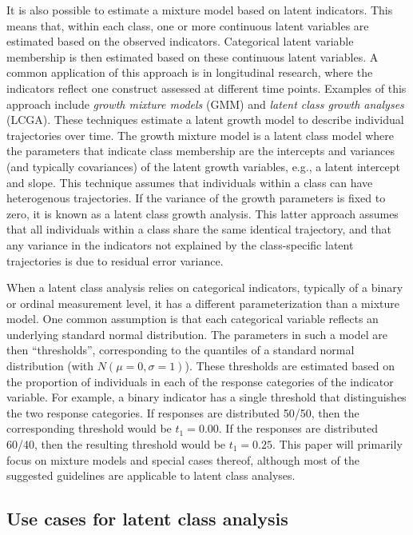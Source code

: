 \documentclass[
  ,man]{apa6}
\begin{document}
It is also possible to estimate a mixture model based on latent indicators.
This means that, within each class, one or more continuous latent variables are estimated based on the observed indicators.
Categorical latent variable membership is then estimated based on these continuous latent variables.
A common application of this approach is in longitudinal research, where the indicators reflect one construct assessed at different time points.
Examples of this approach include \emph{growth mixture models} (GMM) and \emph{latent class growth analyses} (LCGA).
These techniques estimate a latent growth model to describe individual trajectories over time.
The growth mixture model is a latent class model where the parameters that indicate class membership
are the intercepts and variances (and typically covariances) of the latent growth variables, e.g., a latent intercept and slope.
This technique assumes that individuals within a class can have heterogenous trajectories.
If the variance of the growth parameters is fixed to zero, it is known as a latent class growth analysis.
This latter approach assumes that all individuals within a class share the same identical trajectory,
and that any variance in the indicators not explained by the class-specific latent trajectories is due to residual error variance.

When a latent class analysis relies on categorical indicators,
typically of a binary or ordinal measurement level,
it has a different parameterization than a mixture model.
One common assumption is that each categorical variable reflects an underlying standard normal distribution.
The parameters in such a model are then ``thresholds'', corresponding to the quantiles of a standard normal distribution (with \(N(\mu = 0, \sigma = 1)\)).
These thresholds are estimated based on the proportion of individuals in each of the response categories of the indicator variable.
For example, a binary indicator has a single threshold that distinguishes the two response categories.
If responses are distributed 50/50, then the corresponding threshold would be \(t_1 = 0.00\).
If the responses are distributed 60/40, then the resulting threshold would be \(t_1 = 0.25\).
This paper will primarily focus on mixture models and special cases thereof,
although most of the suggested guidelines are applicable to latent class analyses.

\hypertarget{use-cases-for-latent-class-analysis}{%
\subsection{Use cases for latent class analysis}\label{use-cases-for-latent-class-analysis}}
\end{document}

